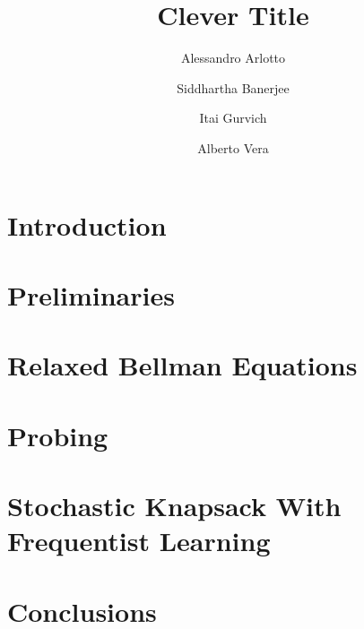 \documentclass[format=sigconf, screen=true]{acmart}
\begin{document}
\title{Clever Title} 

\author{Alessandro Arlotto} 
\author{Siddhartha Banerjee}
\author{Itai Gurvich}
\author{Alberto Vera}



\begin{abstract}

\end{abstract}

\maketitle

\section{Introduction}


\section{Preliminaries}


\section{Relaxed Bellman Equations}


\section{Probing}


\section{Stochastic Knapsack With Frequentist Learning}


\section{Conclusions}





\end{document}
